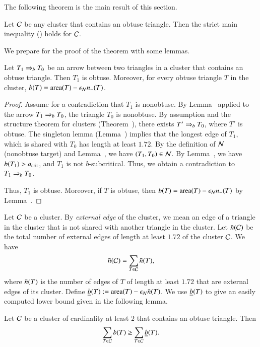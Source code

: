 The following theorem is the main result of this
section.

\begin{theorem}  
  Let $\mathcal C$ be any cluster that contains an obtuse triangle.  Then 
   the strict main inequality ()
  holds for $\mathcal C$.
\end{theorem}

We prepare for the proof of the theorem with some lemmas.

\begin{lemma}  
  Let $T_1\Rightarrow_{b} T_0$ be an
  arrow between two triangles in a cluster that contains an obtuse
  triangle.  Then $T_1$ is obtuse.  Moreover, for every obtuse
  triangle $T$ in the cluster, $b(T) = {\operatorname{area}}(T) -\epsilon_{\mathcal N} n_-(T)$.
\end{lemma}

\begin{proof} 
  Assume for a contradiction that $T_1$ is nonobtuse.  By
  Lemma~ applied to the arrow $T_1\Rightarrow_{b} T_0$, the
  triangle $T_0$ is nonobtuse.  By assumption and the structure
  theorem for clusters (Theorem~), there exists $T'\Rightarrow_{b} T_0$, where $T'$ is
  obtuse.  The singleton lemma (Lemma~) implies
  that the longest edge of $T_1$, which is shared with $T_0$ has
  length at least $1.72$.  By the definition of $\mathcal N$ (nonobtuse
  target) and Lemma~, we have $(T_1,T_0)\in\mathcal N$.  By Lemma~, we have
  $b(T_1)>a_\text{crit}$, and $T_1$ is not $b$-subcritical.  Thus, we obtain
  a contradiction to $T_1\Rightarrow_{b} T_0$.

 Thus, $T_1$ is obtuse.
  Moreover, if $T$ is obtuse, then $b(T) = {\operatorname{area}}(T) -\epsilon_{\mathcal N} n_-(T)$ by
  Lemma~.
\end{proof}

Let $\mathcal C$ be a cluster.  By {\it external edge} of the cluster, we mean an
edge of a triangle in the cluster that is not shared with another
triangle in the cluster.  Let $\bar n(\mathcal C)$ be the total number of
external edges of length at least $1.72$ of the cluster $\mathcal C$.  We have
\[
\bar n(\mathcal C) =\sum_{T\in \mathcal C} \bar n(T),
\]
where $\bar n(T)$ is the number of edges of $T$ of length at least $1.72$
that are external edges of its cluster.
Define $\underline{b}(T) := {\operatorname{area}}(T)-\epsilon_{\mathcal N}\bar n(T)$.  We use $\underline{b}(T)$ to give an
easily computed lower bound given in the following lemma.

\begin{lemma} 
  Let $\mathcal C$ be a cluster of cardinality at least $2$ 
  that contains an obtuse triangle.
Then 
\[
\sum_{T\in\mathcal C} b(T)\ge \sum_{T\in\mathcal C} \underline{b}(T).
\]
\end{lemma}

